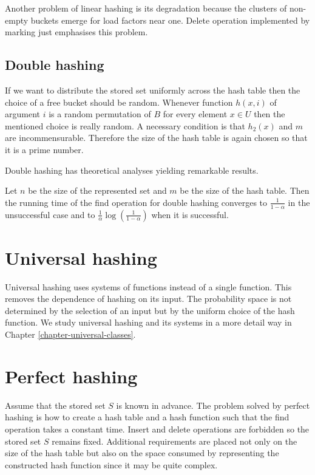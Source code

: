 Another problem of linear hashing is its degradation because the clusters of non-empty buckets emerge for load factors near one. Delete operation implemented by marking just emphasises this problem.

\subsection{Double hashing}
If we want to distribute the stored set uniformly across the hash table then the choice of a free bucket should be random. Whenever function $h(x, i)$ of argument $i$ is a random permutation of $B$ for every element $x \in U$ then the mentioned choice is really random. A necessary condition is that $h_2(x)$ and $m$ are incommensurable. Therefore the size of the hash table is again chosen so that it is a prime number. 

Double hashing has theoretical analyses yielding remarkable results.
\begin{theorem}
Let $n$ be the size of the represented set and $m$ be the size of the hash table. Then the running time of the find operation for double hashing converges to $\frac{1}{1 - \alpha}$ in the unsuccessful case and to $\frac{1}{\alpha}\log\left(\frac{1}{1 - \alpha}\right)$ when it is successful.
\end{theorem}

\section{Universal hashing}
Universal hashing uses systems of functions instead of a single function. This removes the dependence of hashing on its input. The probability space is not determined by the selection of an input but by the uniform choice of the hash function. We study universal hashing and its systems in a more detail way in Chapter \ref{chapter-universal-classes}.

\section{Perfect hashing}
Assume that the stored set $S$ is known in advance. The problem solved by perfect hashing is how to create a hash table and a hash function such that the find operation takes a constant time. Insert and delete operations are forbidden so the stored set $S$ remains fixed. Additional requirements are placed not only on the size of the hash table but also on the space consumed by representing the constructed hash function since it may be quite complex.

